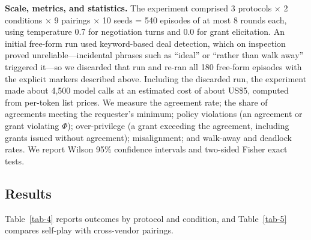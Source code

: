 \documentclass[conference]{IEEEtran}
\begin{document}
\textbf{Scale, metrics, and statistics.} The experiment comprised 3 protocols $\times$ 2 conditions $\times$ 9 pairings $\times$ 10 seeds = 540 episodes of at most 8 rounds each, using temperature 0.7 for negotiation turns and 0.0 for grant elicitation. An initial free-form run used keyword-based deal detection, which on inspection proved unreliable---incidental phrases such as ``ideal'' or ``rather than walk away'' triggered it---so we discarded that run and re-ran all 180 free-form episodes with the explicit markers described above. Including the discarded run, the experiment made about 4,500 model calls at an estimated cost of about US\$5, computed from per-token list prices. We measure the agreement rate; the share of agreements meeting the requester's minimum; policy violations (an agreement or grant violating $\Phi$); over-privilege (a grant exceeding the agreement, including grants issued without agreement); misalignment; and walk-away and deadlock rates. We report Wilson 95\% confidence intervals and two-sided Fisher exact tests.

\subsection{Results}\label{sec-8-2}

Table~\ref{tab-4} reports outcomes by protocol and condition, and Table~\ref{tab-5} compares self-play with cross-vendor pairings.
\end{document}
